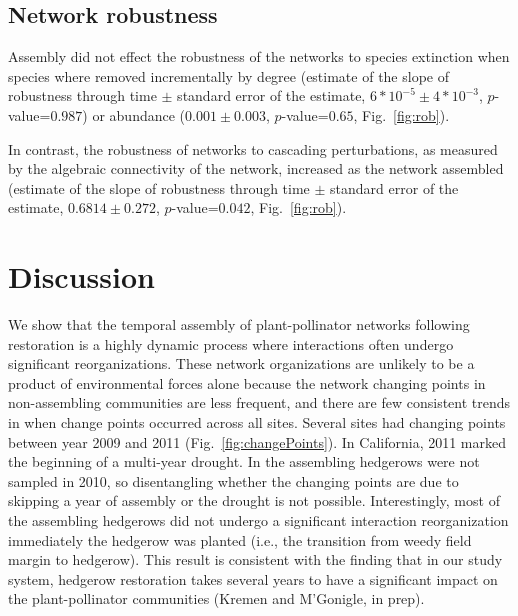 \documentclass[12pt]{article}
\begin{document}
\subsection*{Network robustness}
Assembly did not effect the robustness of the networks to species
extinction when species where removed incrementally by degree
(estimate of the slope of robustness through time $\pm$ standard error
of the estimate, $6*10^{-5} \pm 4*10^{-3}$, $p$-value=$0.987$) or
abundance ($0.001 \pm 0.003$, $p$-value=$0.65$, Fig.~\ref{fig:rob}).

In contrast, the robustness of networks to cascading perturbations, as
measured by the algebraic connectivity of the network, increased as
the network assembled (estimate of the slope of robustness through
time $\pm$ standard error of the estimate, $0.6814 \pm 0.272$,
$p$-value=$0.042$, Fig.~\ref{fig:rob}).

\section*{Discussion}
\label{sec:discussion}

We show that the temporal assembly of plant-pollinator networks
following restoration is a highly dynamic process where interactions
often undergo significant reorganizations. These network organizations
are unlikely to be a product of environmental forces alone because the
network changing points in non-assembling communities are less
frequent, and there are few consistent trends in when change points
occurred across all sites. Several sites had changing points between
year 2009 and 2011 (Fig.~\ref{fig:changePoints}). In California, 2011
marked the beginning of a multi-year drought. In the assembling
hedgerows were not sampled in 2010, so disentangling whether the
changing points are due to skipping a year of assembly or the drought
is not possible. Interestingly, most of the assembling hedgerows did
not undergo a significant interaction reorganization immediately the
hedgerow was planted (i.e., the transition from weedy field margin to
hedgerow). This result is consistent with the finding that in our
study system, hedgerow restoration takes several years to have a
significant impact on the plant-pollinator communities (Kremen and
M'Gonigle, in prep).
\end{document}
